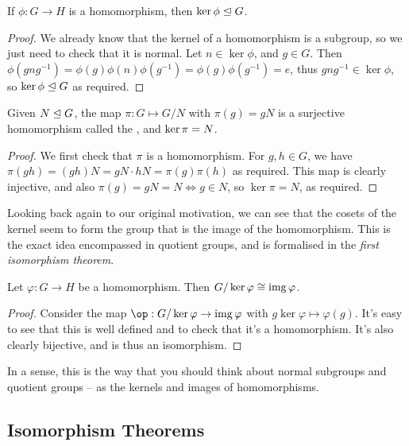 \documentclass[a4paper]{scrartcl}
\begin{document}
\begin{theorem*}
	If $\phi: G \rightarrow H$ is a homomorphism, then $\ker \phi \trianglelefteq G$.
\end{theorem*}
\begin{proof}
	We already know that the kernel of a homomorphism is a subgroup, so we just need to check that it is normal. Let $n \in \ker \phi$, and $g \in G$. Then $\phi(gng^{-1}) = \phi(g) \phi(n)\phi(g^{-1}) = \phi(g) \phi(g^{-1}) = e$, thus $gng^{-1} \in \ker \phi$, so $\ker \phi \trianglelefteq G$ as required.
\end{proof}

\begin{theorem*}
	Given $N \trianglelefteq G$, the map $\pi: G \mapsto G/N$ with $\pi(g) = gN$ is a surjective homomorphism called the , and $\operatorname{ker} \pi = N$. 
\end{theorem*}
\begin{proof}
We first check that $\pi$ is a homomorphism. For $g, h \in G$, we have $\pi(gh) = (gh)N = gN \cdot hN = \pi(g) \pi(h)$ as required. This map is clearly injective, and also $\pi(g) = gN = N \iff g \in N$, so $\ker \pi = N$, as required.
\end{proof}


Looking back again to our original motivation, we can see that the cosets of the kernel seem to form the group that is the image of the homomorphism. This is the exact idea encompassed in quotient groups, and is formalised in the \emph{first isomorphism theorem}.

\begin{theorem*}
	Let $\varphi:G \rightarrow H$ be a homomorphism. Then $G/\operatorname{ker} \varphi \cong \operatorname{img} \varphi$.
\end{theorem*}
\begin{proof}
	Consider the map $\op: G/\ker\varphi \rightarrow \image \varphi$ with $g\ker\varphi \mapsto \varphi(g)$. It's easy to see that this is well defined and to check that it's a homomorphism. It's also clearly bijective, and is thus an isomorphism.
\end{proof}

In a sense, this is the way that you should think about normal subgroups and quotient groups -- as the kernels and images of homomorphisms.


\subsection{Isomorphism Theorems}
\end{document}

